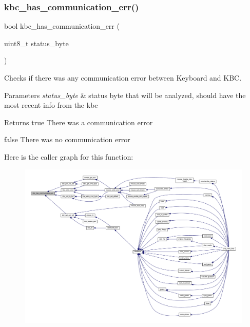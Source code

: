 \subsubsection{\texorpdfstring{kbc\+\_\+has\+\_\+communication\+\_\+err()}{kbc\_has\_communication\_err()}}
{\footnotesize\ttfamily bool kbc\+\_\+has\+\_\+communication\+\_\+err (\begin{DoxyParamCaption}\item[{uint8\+\_\+t}]{status\+\_\+byte }\end{DoxyParamCaption})}



Checks if there was any communication error between Keyboard and K\+BC. 


\begin{DoxyParams}{Parameters}
{\em status\+\_\+byte} & status byte that will be analyzed, should have the most recent info from the kbc \\
\hline
\end{DoxyParams}
\begin{DoxyReturn}{Returns}
true There was a communication error 

false There was no communication error 
\end{DoxyReturn}
Here is the caller graph for this function\+:\nopagebreak
\begin{figure}[H]
\begin{center}
\leavevmode
\includegraphics[width=350pt]{group__keyboard_ga8348b9b1e74639dd7edf7e939ea2e1d1_icgraph}
\end{center}
\end{figure}
\mbox{\label{group__keyboard_ga710a06495d4ad2c8afba84634ec89984}} 
